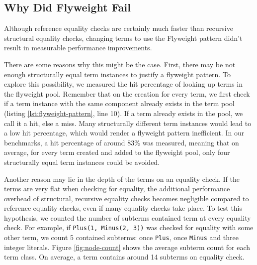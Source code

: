\documentclass[11pt]{article}
\begin{document}



    \subsection{Why Did Flyweight Fail}

    Although reference equality checks are certainly much faster than recursive structural equality
    checks, changing terms to use the Flyweight pattern didn't result in measurable performance improvements.

    There are some reasons why this might be the case. First, there may be not enough structurally
    equal term instances to justify
    a flyweight pattern. To explore this possibility, we measured the hit percentage
    of looking up terms in the flyweight pool. Remember that on the creation for every
    term, we first check if a term instance with the same component already exists in the
    term pool (listing \ref{lst:flyweight-pattern}, line 10).
    If a term already exists in the pool, we call it a hit, else a miss.
    Many structurally different term instances would lead to
    a low hit percentage, which would render a flyweight pattern inefficient. In our
    benchmarks, a hit percentage of around 83\% was measured, meaning that on average,
    for every term created and added to the flyweight pool,
    only four structurally equal term instances could be avoided.

    Another reason may lie in the depth of the terms on an equality check. If
    the terms are very flat when checking for equality, the additional performance overhead of structural, recursive equality checks becomes negligible compared to reference equality checks, even
    if many equality checks take place. To test this hypothesis, we counted the number of subterms
    contained term at every equality check. For example, if \texttt{Plus(1, Minus(2, 3))} was checked for equality with some other term,
    we count 5 contained subterms: once \texttt{Plus}, once \texttt{Minus} and three integer literals.
    Figure \ref{fig:node-count} shows the average subterm count for each term class. On average,
    a term contains around 14 subterms on equality check.
\end{document}
